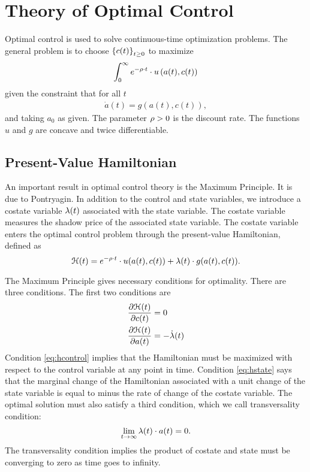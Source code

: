 \documentclass[letterpaper,12pt,leqno]{article}
\begin{document}
\section{Theory of Optimal Control}

Optimal control is used to solve continuous-time optimization problems. The general problem is to choose $\left\lbrace c(t) \right\rbrace_{t\geq 0}$ to maximize
\begin{align}
\int_{0}^{\infty}e^{-\rho\cdot  t}\cdot  u\left(  a(t),c(t) \right)\label{dpc} 
\end{align}
given the constraint that for all $t$
\begin{align}
\dot{a}(t) = g(a(t),c(t)),\label{eq:thelaw}
\end{align}
and taking $a_{0}$ as given.  The parameter $\rho >0$ is the discount rate. The functions $u$ and $g$ are concave and twice differentiable.

\subsection{Present-Value Hamiltonian}
An important result in optimal control theory is the Maximum Principle. It is due to Pontryagin. In addition to the control and state variables, we introduce a costate variable $\lambda (t)$  associated with the state variable. The costate variable measures the shadow price of the associated state variable. The costate variable enters the optimal control
problem through the present-value Hamiltonian, defined as 
\begin{equation}
\mathcal{H}(t)=e^{-\rho\cdot  t}\cdot  u(a(t),c(t)) +\lambda(t)\cdot g(a(t),c(t)).  
\label{eq:HAMILDEF}\end{equation}

The Maximum Principle gives necessary conditions for optimality. There are three conditions. The first two conditions are
\begin{align}
\frac{\partial \mathcal{H}(t)}{\partial c(t)} &=0  \label{eq:hcontrol} \\
\frac{\partial \mathcal{H}(t)}{\partial a(t)} &=-\dot{\lambda}(t)  \label{eq:hstate}
\end{align}
Condition \eqref{eq:hcontrol} implies that the Hamiltonian must be maximized
with respect to the control variable at any point in time. Condition \eqref{eq:hstate} says that the marginal change of the Hamiltonian associated with a unit change of the state variable is equal to  minus the rate of
change of the costate variable. The optimal solution must also satisfy a third condition, which we call transversality condition:
\begin{equation}
\lim_{t\to \infty }\lambda(t)\cdot a(t)=0.  \label{eq:tvc}
\end{equation}
The transversality condition implies the product of costate and state must be converging to zero as time goes to infinity.
\end{document}
